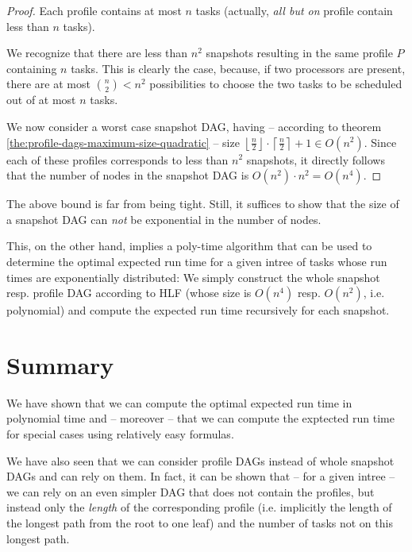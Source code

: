 \begin{proof}
  Each profile contains at most $n$ tasks (actually, \emph{all but on} profile contain less than $n$ tasks).

  We recognize that there are less than $n^2$ snapshots resulting in the same profile $P$ containing $n$ tasks. This is clearly the case, because, if two processors are present, there are at most $\binom{n}{2} < n^2$ possibilities to choose the two tasks to be scheduled out of at most $n$ tasks.

  \newcommand{\ceiln}{\left\lceil \frac{n}{2} \right\rceil}
  \newcommand{\floorn}{\left\lfloor \frac{n}{2} \right\rfloor}
  We now consider a worst case snapshot DAG, having -- according to theorem \ref{the:profile-dags-maximum-size-quadratic} -- size $\floorn \cdot \ceiln +1 \in O(n^2)$. Since each of these profiles corresponds to less than $n^2$ snapshots, it directly follows that the number of nodes in the snapshot DAG is $O(n^2)\cdot n^2 = O(n^4)$.
\end{proof}

The above bound is far from being tight. Still, it suffices to show that the size of a snapshot DAG can \emph{not} be exponential in the number of nodes.

This, on the other hand, implies a poly-time algorithm that can be used to determine the optimal expected run time for a given intree of tasks whose run times are exponentially distributed: We simply construct the whole snapshot resp. profile DAG according to HLF (whose size is $O(n^4)$ resp. $O(n^2)$, i.e. polynomial) and compute the expected run time recursively for each snapshot.

\section{Summary}
\label{sec:p2-summary}

We have shown that we can compute the optimal expected run time in polynomial time and -- moreover -- that we can compute the exptected run time for special cases using relatively easy formulas. 

We have also seen that we can consider profile DAGs instead of whole snapshot DAGs and can rely on them. In fact, it can be shown that -- for a given intree -- we can rely on an even simpler DAG that does not contain the profiles, but instead only the \emph{length} of the corresponding profile (i.e. implicitly the length of the longest path from the root to one leaf) and the number of tasks not on this longest path.

